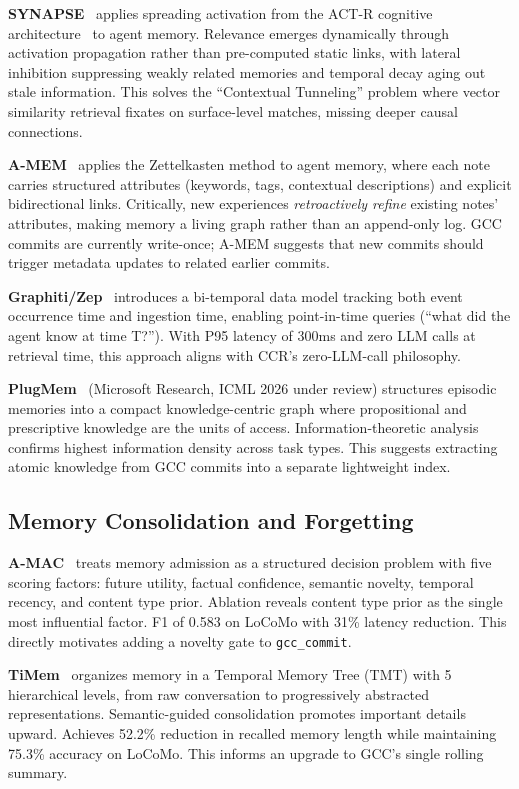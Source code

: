\documentclass[11pt]{article}
\begin{document}
\textbf{SYNAPSE}~\cite{synapse} applies spreading activation from the ACT-R cognitive architecture~\cite{actr} to agent memory. Relevance emerges dynamically through activation propagation rather than pre-computed static links, with lateral inhibition suppressing weakly related memories and temporal decay aging out stale information. This solves the ``Contextual Tunneling'' problem where vector similarity retrieval fixates on surface-level matches, missing deeper causal connections.

\textbf{A-MEM}~\cite{amem} applies the Zettelkasten method to agent memory, where each note carries structured attributes (keywords, tags, contextual descriptions) and explicit bidirectional links. Critically, new experiences \textit{retroactively refine} existing notes' attributes, making memory a living graph rather than an append-only log. GCC commits are currently write-once; A-MEM suggests that new commits should trigger metadata updates to related earlier commits.

\textbf{Graphiti/Zep}~\cite{graphiti} introduces a bi-temporal data model tracking both event occurrence time and ingestion time, enabling point-in-time queries (``what did the agent know at time T?''). With P95 latency of 300ms and zero LLM calls at retrieval time, this approach aligns with CCR's zero-LLM-call philosophy.

\textbf{PlugMem}~\cite{plugmem} (Microsoft Research, ICML 2026 under review) structures episodic memories into a compact knowledge-centric graph where propositional and prescriptive knowledge are the units of access. Information-theoretic analysis confirms highest information density across task types. This suggests extracting atomic knowledge from GCC commits into a separate lightweight index.

\subsection{Memory Consolidation and Forgetting}

\textbf{A-MAC}~\cite{amac} treats memory admission as a structured decision problem with five scoring factors: future utility, factual confidence, semantic novelty, temporal recency, and content type prior. Ablation reveals content type prior as the single most influential factor. F1 of 0.583 on LoCoMo with 31\% latency reduction. This directly motivates adding a novelty gate to \texttt{gcc\_commit}.

\textbf{TiMem}~\cite{timem} organizes memory in a Temporal Memory Tree (TMT) with 5 hierarchical levels, from raw conversation to progressively abstracted representations. Semantic-guided consolidation promotes important details upward. Achieves 52.2\% reduction in recalled memory length while maintaining 75.3\% accuracy on LoCoMo. This informs an upgrade to GCC's single rolling summary.
\end{document}

